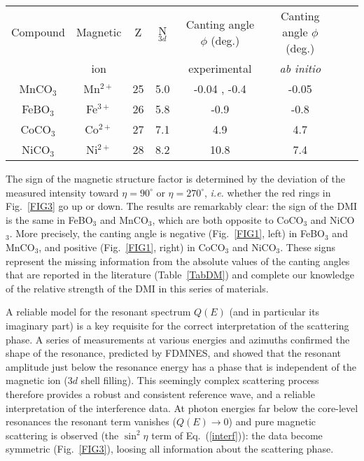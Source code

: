 \documentclass[aps,prl,showpacs,reprint,floatfix]{revtex4-1}
\begin{document}
\begin{table*}
\caption{Experimental and theoretical values of the canting angle (degrees). 
The experimental magnitudes are taken from the literature. 
The experimental signs and the \textit{ab initio} values are taken from this work.
The sign of the canting angle corresponds to the sign of the DMI. 
N$_{3d}$ is the number of the $3d$ electrons per transition metal site obtained from first-principles calculations (for details, see Supplemental Material).}
\label{TabDM}
\begin{tabular}{cccccccc}
  \hline
  \hline
  Compound	   & Magnetic & Z  & N$_{3d}$ & Canting angle $\phi$ (deg.) & Canting angle $\phi$ (deg.)\\
	   	   & ion      &    &          & experimental                &  \textit{ab initio} \\
  \hline
  MnCO$_3$ & Mn$^{2+}$ & 25 & 5.0 & -0.04 \cite{Kosterov2006234} , -0.4 \cite{Borovik1959,Kreines} & -0.05 \\
  FeBO$_3$ & Fe$^{3+}$ & 26 & 5.8 & -0.9 \cite{Petrov}                              & -0.8 \\
  CoCO$_3$ & Co$^{2+}$ & 27 & 7.1 & 4.9 \cite{Borovik1961,Kreines}   & 4.7 \\
  NiCO$_3$ & Ni$^{2+}$ & 28 & 8.2 & 10.8 \cite{Kreines}                           & 7.4 \\
\hline
\hline
\end{tabular}
\end{table*}


The sign of the magnetic structure factor is determined by the deviation of the measured intensity toward $\eta=90^\circ$ or $\eta=270^\circ$, {\it i.e.} whether 
the red rings in Fig.~\ref{FIG3} go up or down. The results are remarkably clear:
the sign of the DMI is the same in FeBO$_3$ and MnCO$_3$, which are both opposite to CoCO$_3$ and NiCO$_3$.
More precisely, 
the canting angle is negative (Fig.~\ref{FIG1}, left) in FeBO$_3$ and MnCO$_3$, and positive (Fig.~\ref{FIG1}, right) in CoCO$_3$ and NiCO$_3$.
These signs represent the missing information from the absolute values of the canting angles that are reported in the literature (Table~\ref{TabDM}) and complete our knowledge of the relative strength of the DMI in this series of materials.


A reliable model for the resonant spectrum 
$Q(E)$ (and in particular its imaginary part)
is a key requisite for the  correct interpretation of the scattering phase. A series of measurements at various energies and azimuths
confirmed the shape of the resonance, predicted by FDMNES, and showed that the resonant amplitude just below the resonance energy has a phase that is independent of the 
magnetic ion ($3d$ shell filling). This seemingly complex scattering process therefore provides a robust and consistent reference wave, and a reliable interpretation of the 
interference data.
At photon energies far below the core-level resonances 
the resonant term vanishes ($Q(E)\rightarrow 0$) and pure magnetic scattering is observed (the $\sin^2\eta$ term of Eq.~(\ref{interf})): the data become symmetric (Fig.~\ref{FIG3}), loosing all information about the scattering phase.
\end{document}
